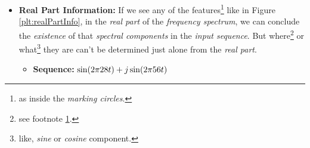 \documentclass[../../course]{subfiles}
\begin{document}
\begin{itemize} [label=]
\begin{itemize} [label=]
            \item From Figure \ref{fig:compRealImagComp} we can see that we actually get
                some sense about each of the \emph{frequency components} from
                both the \emph{real} and \emph{imaginary} parts equally, but if
                we want to know where each \emph{frequency}
                belong\footnote{\label{fnt:whereBelong}like, to the \emph{real part} or the
                \emph{imaginary part}.} or the \emph{phase} of these
                \emph{frequency components}, we need to analyse both of them.
                If we are only \emph{interested} in the \emph{frequency
                components}, we could just take the \emph{absolute value} of
                our \emph{frequency spectrum}. That would give us the
                \emph{amplitude spectrum} of the \emph{frequency spectrum}.
                \emph{Amplitude spectrum} will have \emph{clean pulses}\footnote{the
                \emph{width} and the \emph{height} of these pulses will vary depending on the
                \emph{sample count}, ie, if we take \emph{higher} point \textsc{dft}, the
                \emph{pulses} will be sharp.} corresponding to each of the \emph{frequency
                components}.

        \end{itemize}

    \item \textbf{Real Part Information:} If we see any of the
        features\footnote{\label{fnt:infoMarkCircle}as inside the
        \emph{marking circles}.} like in Figure \ref{plt:realPartInfo}, in
        the \emph{real part} of the \emph{frequency spectrum}, we can conclude
        the \emph{existence} of that \emph{spectral components} in the
        \emph{input sequence}. But where\footnote{see footnote
        \ref{fnt:whereBelong}.} or what\footnote{\label{fnt:whatTheyAare}like,
        \emph{sine} or \emph{cosine} component.} they are can't be determined
        just alone from the \emph{real part}.

        \begin{itemize} [label=]

            \item \textbf{Sequence:} $\sin(2 \pi 28 t) + j \sin(2 \pi 56 t)$


\end{itemize}
\end{itemize}
\end{document}
